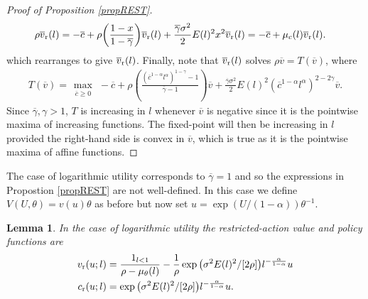 \documentclass[11pt]{article}
\theoremstyle{plain}
\newtheorem{lemma}[thm]{Lemma}
\begin{document}
\begin{proof}[Proof of Proposition \ref{propREST}]
\begin{align*} 
\rho \overline{v}_{\textnormal{r}}(l)  & = -\overline{c} + \rho {\left(\frac{1 - x}{1-\overline{\gamma}}\right)}\overline{v}_{\textnormal{r}}(l) + \frac{\overline{\gamma}\sigma^2}{2} E(l)^2x^2 \overline{v}_{\textnormal{r}}(l) = -\overline{c} + \mu_c(l) \overline{v}_{\textnormal{r}}(l).
\end{align*}
which rearranges to give $\overline{v}_{\textnormal{r}}(l)$. Finally, note that $\overline{v}_{\textnormal{r}}(l)$ solves $\rho \overline{v} = T(\overline{v})$, where 
\begin{align*}
T(\overline{v}) = \max_{\substack{\overline{c} \geq 0}} \ - \overline{c} + \rho {\left(\frac{ (\overline{c}^{1-\alpha}l^{\alpha})^{1-\gamma} - 1}{\overline{\gamma} - 1} \right)}\overline{v} + \frac{\overline{\gamma}\sigma^2}{2} E(l)^2 {\left(\overline{c}^{1-\alpha}l^{\alpha} \right)}^{2-2\gamma} \overline{v} .
\end{align*}
Since $\overline{\gamma}, \gamma >1$, $T$ is increasing in $l$ whenever $\overline{v}$ is negative since it is the pointwise maxima of increasing functions. The fixed-point will then be increasing in $l$ provided the right-hand side is convex in $\overline{v}$, which is true as it is the pointwise maxima of affine functions. 
\end{proof}


The case of logarithmic utility corresponds to $\overline{\gamma}=1$ and so the expressions in Propostion \ref{propREST} are not well-defined. In this case we define $V(U,\theta) = v(u)\theta$ as before but now set $u = \exp(U/(1-\alpha))\theta^{-1}$. %

\begin{lemma}\label{RESTlogLEMMA}
In the case of logarithmic utility the restricted-action value and policy functions are 
\begin{equation}
\begin{aligned}
v_{\textnormal{r}}(u;l) & = \frac{1_{l<1}}{\rho-\mu_{\theta}(l)} - \frac{1}{\rho}\exp{\left(\sigma^2E(l)^2/[2\rho]\right)}l^{-\frac{\alpha}{1-\alpha}}u
\\ c_{\textnormal{r}}(u;l) & = \exp{\left(\sigma^2E(l)^2/[2\rho]\right)}l^{-\frac{\alpha}{1-\alpha}}u.
\label{RESTlog}
\end{aligned}
\end{equation}
\end{lemma}
\end{document}
